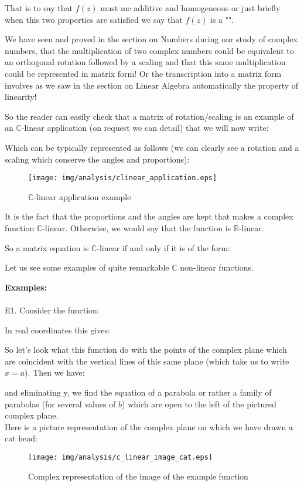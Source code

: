 That is to say that $f(z)$ must me additive and homogeneous or just briefly when this two properties are satisfied we say that $f(z)$ is a "".

We have seen and proved in the section on Numbers during our study of complex numbers, that the multiplication of two complex numbers could be equivalent to an orthogonal rotation followed by a scaling and that this same multiplication could be represented in matrix form! Or the transcription into a matrix form involves as we saw in the section on Linear Algebra automatically  the property of linearity!

So the reader can easily check that a matrix of rotation/scaling is an example of an $\mathbb{C}$-linear application (on request we can detail) that we will now write:
	
Which can be typically represented as follows (we can clearly see a rotation and a scaling which conserve the angles and proportions):

\begin{figure}[H]
\centering
\texttt{[image: img/analysis/clinear\_application.eps]}
\caption{$\mathbb{C}$-linear application example}
\end{figure}

It is the fact that the proportions and the angles are kept that makes a complex function $\mathbb{C}$-linear. Otherwise, we would say that the function is $\mathbb{R}$-linear.

So a matrix equation is $\mathbb{C}$-linear if and only if it is of the form:
	
Let us see some examples of quite remarkable $\mathbb{C}$ non-linear functions.

	\begin{tcolorbox}[colframe=black,colback=white,sharp corners]
\textbf{{\Large {}}Examples:}\\\\
E1. Consider the function:
	
In real coordinates this gives:
		
So let's look what this function do with the points of the complex plane which are coincident with the vertical lines of this same plane (which take us to write $x=a$). Then we have:
	
	and eliminating y, we find the equation of a parabola or rather a family of  parabolas (for several values of $b$) which are open to the left of the pictured complex plane.\\

	Here is a picture representation of the complex plane on which we have drawn a cat head:
	\begin{figure}[H]
		\begin{center}
			\texttt{[image: img/analysis/c\_linear\_image\_cat.eps]}
		\end{center}	
		\caption{Complex representation of the image of the example function}
	\end{figure}
	\end{tcolorbox}

